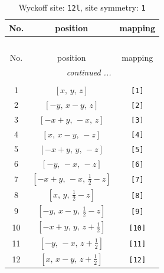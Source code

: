 \documentclass[fleqn,8pt]{jsarticle}
\begin{document}
\begin{longtable}{ccc}
\caption{Wyckoff site: {\tt 12l}, site symmetry: {\tt 1}}
 \\
 \hline \hline
No. & position & mapping \\ \hline \endfirsthead

\multicolumn{2}{l}{\tablename\ \thetable{}} \\
 \hline \hline
No. & position & mapping \\ \hline \endhead

 \hline \hline
\multicolumn{2}{r}{\footnotesize\it continued ...} \\ \endfoot

 \hline \hline
\multicolumn{2}{r}{} \\ \endlastfoot

1 & $\left[ x,\, y,\, z \right]$ & {\tt [1]} \\ \hline
2 & $\left[ - y,\, x - y,\, z \right]$ & {\tt [2]} \\ \hline
3 & $\left[ - x + y,\, - x,\, z \right]$ & {\tt [3]} \\ \hline
4 & $\left[ x,\, x - y,\, - z \right]$ & {\tt [4]} \\ \hline
5 & $\left[ - x + y,\, y,\, - z \right]$ & {\tt [5]} \\ \hline
6 & $\left[ - y,\, - x,\, - z \right]$ & {\tt [6]} \\ \hline
7 & $\left[ - x + y,\, - x,\, \frac{1}{2} - z \right]$ & {\tt [7]} \\ \hline
8 & $\left[ x,\, y,\, \frac{1}{2} - z \right]$ & {\tt [8]} \\ \hline
9 & $\left[ - y,\, x - y,\, \frac{1}{2} - z \right]$ & {\tt [9]} \\ \hline
10 & $\left[ - x + y,\, y,\, z + \frac{1}{2} \right]$ & {\tt [10]} \\ \hline
11 & $\left[ - y,\, - x,\, z + \frac{1}{2} \right]$ & {\tt [11]} \\ \hline
12 & $\left[ x,\, x - y,\, z + \frac{1}{2} \right]$ & {\tt [12]} \\
\end{longtable}
\end{document}

